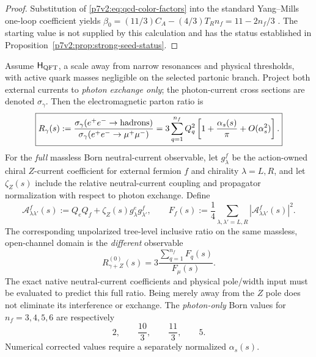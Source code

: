 \documentclass[12pt,a4paper]{article}
\newcommand{\Hqft}{\mathsf{H}_{\rm QFT}}
\begin{document}
\begin{proof}
Substitution of \eqref{p7v2:eq:qcd-color-factors} into the standard Yang--Mills
one-loop coefficient yields
\(\beta_0=(11/3)C_A-(4/3)T_Rn_f=11-2n_f/3\)
\cite{GrossWilczek1973,Politzer1973}.  The starting value is not supplied by
this calculation and has the status established in
Proposition~\ref{p7v2:prop:strong-seed-status}.
\end{proof}

\begin{proposition}
\label{p7v2:prop:inclusive-rgamma}
Assume \(\Hqft\), a scale away from narrow resonances and physical
thresholds, with active quark masses negligible on the selected partonic
branch. Project both external currents to \emph{photon exchange only};
the photon-current cross sections are denoted \(\sigma_\gamma\).
Then the electromagnetic parton ratio is
\begin{equation}
\label{p7v2:eq:inclusive-rgamma}
 \boxed{R_\gamma(s)
 :=\frac{\sigma_\gamma(e^+e^-\to{\rm hadrons})}
          {\sigma_\gamma(e^+e^-\to\mu^+\mu^-)}
 =3\sum_{q=1}^{n_f}Q_q^2
 \left[1+\frac{\alpha_s(s)}{\pi}+O(\alpha_s^2)\right].}
\end{equation}
For the \emph{full} massless Born neutral-current observable, let
\(g_\lambda^f\) be the action-owned chiral \(Z\)-current coefficient
for external fermion \(f\) and chirality \(\lambda=L,R\), and let
\(\zeta_Z(s)\) include the relative neutral-current coupling and
propagator normalization with respect to photon exchange. Define
\[
 \mathcal A_{\lambda\lambda'}^f(s)
 :=Q_eQ_f+\zeta_Z(s)g_\lambda^eg_{\lambda'}^f,
 \qquad
 F_f(s):=\frac14\sum_{\lambda,\lambda'=L,R}
            |\mathcal A_{\lambda\lambda'}^f(s)|^2.
\]
The corresponding unpolarized tree-level inclusive ratio on the same
massless, open-channel domain is the \emph{different} observable
\begin{equation}
\label{p7v2:eq:inclusive-neutral-current-born}
 \boxed{R_{\gamma+Z}^{(0)}(s)
 =3\frac{\sum_{q=1}^{n_f}F_q(s)}{F_\mu(s)}.}
\end{equation}
The exact native neutral-current coefficients and physical pole/width
input must be evaluated to predict this full ratio. Being merely away
from the \(Z\) pole does not eliminate its interference or exchange.
The \emph{photon-only} Born values for \(n_f=3,4,5,6\) are respectively
\begin{equation}
\label{p7v2:eq:inclusive-rgamma-born}
 2,\qquad \frac{10}{3},\qquad \frac{11}{3},\qquad5.
\end{equation}
Numerical corrected values require a separately normalized
\(\alpha_s(s)\).
\end{proposition}
\end{document}
